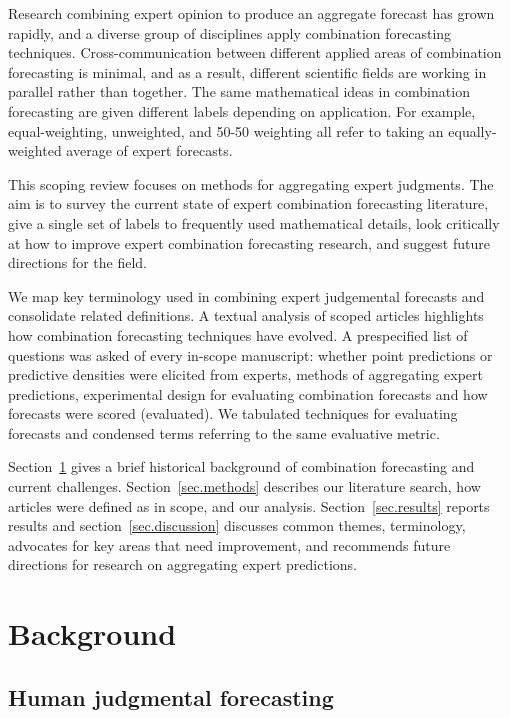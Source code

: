 \documentclass[preprint]{elsarticle}
\begin{document}
Research combining expert opinion to produce an aggregate forecast has grown rapidly, and a diverse group of disciplines apply combination forecasting techniques.
Cross-communication between different applied areas of combination forecasting is minimal, and as a result, different scientific fields are working in parallel rather than together.
The same mathematical ideas in combination forecasting are given different labels depending on application.
For example, equal-weighting, unweighted, and 50-50 weighting all refer to taking an equally-weighted average of expert forecasts.

This scoping review focuses on methods for aggregating expert judgments.
The aim is to survey the current state of expert combination forecasting literature, give a single set of labels to frequently used mathematical details, look critically at how to improve expert combination forecasting research, and suggest future directions for the field. 

We map key terminology used in combining expert judgemental forecasts and consolidate related definitions.
A textual analysis of scoped articles highlights how combination forecasting techniques have evolved.
A prespecified list of questions was asked of every in-scope manuscript: whether point predictions or predictive densities were elicited from experts, methods of aggregating expert predictions, experimental design for evaluating combination forecasts and how forecasts were scored (evaluated).
We tabulated techniques for evaluating forecasts and condensed terms referring to the same evaluative metric.

Section~\ref{background} gives a brief historical background of combination forecasting and current challenges.
Section~\ref{sec.methods} describes our literature search, how articles were defined as in scope, and our analysis.
Section~\ref{sec.results} reports results and section~\ref{sec.discussion} discusses common themes, terminology, advocates for key areas that need improvement, and recommends future directions for research on aggregating expert predictions.

\section{Background}
\label{background}

\subsection{Human judgmental forecasting}
\end{document}

